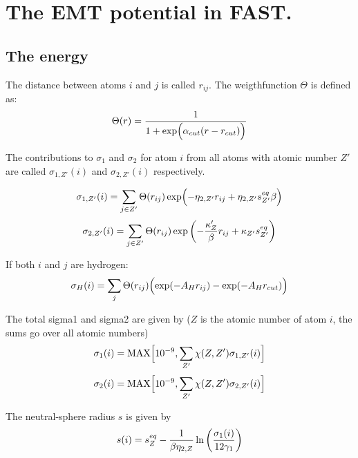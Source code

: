 \documentclass[a4paper,12pt]{article}
\begin{document}
\section*{The EMT potential in FAST.}


\subsection*{The energy}

The distance between atoms $i$ and $j$ is called $r_{ij}$.  The
weigthfunction $\Theta$ is defined as:
\begin{equation}
  \label{theta}
  \Theta(r) = {1 \over 1 + \exp\Bigl(\alpha_{cut} (r - r_{cut}) \Bigr)}
\end{equation}

The contributions to $\sigma_1$ and $\sigma_2$ for atom $i$ from all
atoms with atomic number $Z'$ are called $\sigma_{1,Z'}(i)$ and
$\sigma_{2,Z'}(i)$ respectively.

\begin{equation}
  \label{sigmaone}
  \sigma_{1,Z'}(i) = \sum_{j \in Z'} \Theta(r_{ij}) \exp\Bigl( -
  \eta_{2,Z'} r_{ij} + \eta_{2,Z'} s^{eq}_{Z'} \beta \Bigr)
\end{equation}
\begin{equation}
  \label{sigmatwo}
  \sigma_{2,Z'}(i) = \sum_{j \in Z'} \Theta(r_{ij}) \exp\left( -
  {\kappa_Z' \over \beta} r_{ij} + \kappa_{Z'} s^{eq}_{Z'}  \right)
\end{equation}

If both $i$ and $j$ are hydrogen:
\begin{equation}
  \label{sigmah}
  \sigma_H(i) = \sum_j \Theta(r_{ij}) \Bigl( \exp(-A_H r_{ij}) -
  \exp(-A_H r_{cut}) \Bigr)
\end{equation}

The total sigma1 and sigma2 are given by ($Z$ is the atomic number
of atom $i$, the sums go over all atomic numbers)
\begin{equation}
  \label{totsigmaone}
  \sigma_1(i) = \mbox{MAX}\Bigl[ 10^{-9}, \sum_{Z'} \chi(Z,Z')
  \sigma_{1,Z'}(i) \Bigr]
\end{equation}
\begin{equation}
  \label{totsigmatwo}
  \sigma_2(i) = \mbox{MAX}\Bigl[ 10^{-9}, \sum_{Z'} \chi(Z,Z')
  \sigma_{2,Z'}(i) \Bigr]
\end{equation}

The neutral-sphere radius $s$ is given by
\begin{equation}
  \label{s}
  s(i) = s^{eq}_Z - {1 \over \beta \eta_{2,Z}} \ln \left({ \sigma_1(i)
    \over 12 \gamma_1}\right)
\end{equation}
\end{document}
